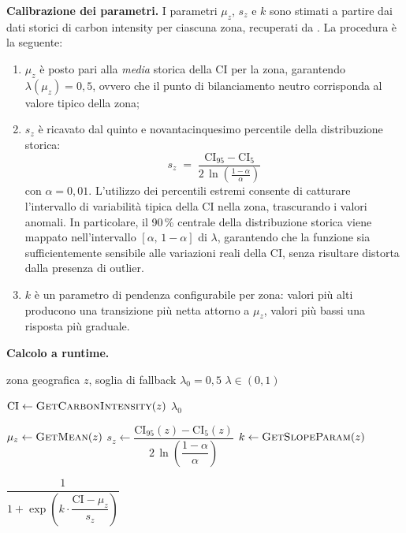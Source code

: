 \medskip
\noindent\textbf{Calibrazione dei parametri.}
I parametri $\mu_z$, $s_z$ e $k$ sono stimati a partire dai
dati storici di carbon intensity per ciascuna zona, recuperati da \cite{electricitymaps2024}. La procedura
è la seguente:
%
\begin{enumerate}
    \item $\mu_z$ è posto pari alla \emph{media} storica della CI per
    la zona, garantendo $\lambda(\mu_z) = 0{,}5$, ovvero che il punto
    di bilanciamento neutro corrisponda al valore tipico della zona;

    \item $s_z$ è ricavato dal quinto e novantacinquesimo percentile
    della distribuzione storica:
    \begin{equation}
        s_z \;=\;
            \frac{\mathrm{CI}_{95} - \mathrm{CI}_5}
                {2\,\ln\!\left(\frac{1-\alpha}{\alpha}\right)}
        \label{eq:s_calibrazione}
    \end{equation}
    con $\alpha = 0{,}01$. L'utilizzo dei percentili estremi consente
    di catturare l'intervallo di variabilità tipica della CI nella zona,
    trascurando i valori anomali. In particolare, il 90\,\% centrale
    della distribuzione storica viene mappato nell'intervallo
    $[\alpha,\, 1-\alpha]$ di $\lambda$, garantendo che la funzione
    sia sufficientemente sensibile alle variazioni reali della CI,
    senza risultare distorta dalla presenza di outlier.

    \item $k$ è un parametro di pendenza configurabile per zona:
    valori più alti producono una transizione più netta attorno a
    $\mu_z$, valori più bassi una risposta più graduale.
\end{enumerate}

\medskip
\noindent\textbf{Calcolo a runtime.}

\begin{algorithm}[H]
\caption{Calcolo del peso $\lambda$ dalla carbon intensity corrente}
\label{alg:lambda}
\begin{algorithmic}[1]
\Require zona geografica $z$, soglia di fallback $\lambda_0 = 0{,}5$
\Ensure $\lambda \in (0, 1)$

\State $\mathrm{CI} \leftarrow \textsc{GetCarbonIntensity}(z)$
    \State \Return $\lambda_0$
\EndIf

\State $\mu_z \leftarrow \textsc{GetMean}(z)$
\State $s_z \leftarrow \dfrac{\mathrm{CI}_{95}(z) - \mathrm{CI}_5(z)}
                              {2\,\ln\!\left(\dfrac{1-\alpha}{\alpha}\right)}$
\State $k \leftarrow \textsc{GetSlopeParam}(z)$

\State \Return $\dfrac{1}{1 + \exp\!\left(k \cdot \dfrac{\mathrm{CI} - \mu_z}{s_z}\right)}$
\end{algorithmic}
\end{algorithm}


